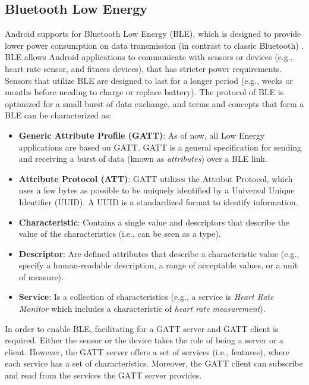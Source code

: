 \subsection{Bluetooth Low Energy}
Android supports for Bluetooth Low Energy (BLE), which is designed to provide lower power consumption on data transmission (in contrast to classic Bluetooth) \cite{bluetoothle}. BLE allows Android applications to communicate with sensors or devices (e.g., heart rate sensor, and fitness devices), that has stricter power requirements. Sensors that utilize BLE are designed to last for a longer period (e.g., weeks or months before needing to charge or replace battery). The protocol of BLE is optimized for a small burst of data exchange, and terms and concepts that form a BLE can be characterized as:
\begin{itemize}
    \item \textbf{Generic Attribute Profile (GATT)}: As of now, all Low Energy applications are based on GATT. GATT is a general specification for sending and receiving a burst of data (known as \textit{attributes}) over a BLE link. 
    \item \textbf{Attribute Protocol (ATT)}: GATT utilizes the Attribut Protocol, which uses a few bytes as possible to be uniquely identified by a Universal Unique Identifier (UUID). A UUID is a standardized format to identify information.
    \item \textbf{Characteristic}: Contains a single value and descriptors that describe the value of the characteristics (i.e., can be seen as a type). 
    \item \textbf{Descriptor}: Are defined attributes that describe a characteristic value (e.g., specify a human-readable description, a range of acceptable values, or a unit of measure).
    \item \textbf{Service}: Is a collection of characteristics (e.g., a service is \textit{Heart Rate Monitor} which includes a characteristic of \textit{heart rate measurement}).
\end{itemize}
In order to enable BLE, facilitating for a GATT server and GATT client is required. Either the sensor or the device takes the role of being a server or a client. However, the GATT server offers a set of services (i.e., features), where each service has a set of characteristics. Moreover, the GATT client can subscribe and read from the services the GATT server provides. 

